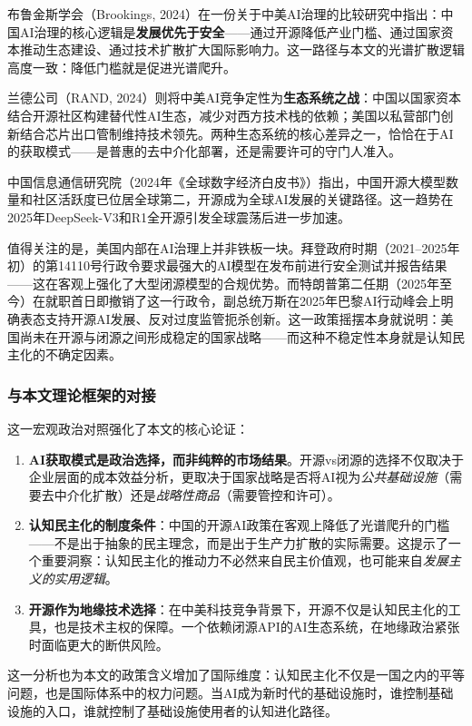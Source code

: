 \documentclass[12pt,a4paper]{ctexart}
\begin{document}
布鲁金斯学会（Brookings, 2024）在一份关于中美AI治理的比较研究中指出：中国AI治理的核心逻辑是\textbf{发展优先于安全}——通过开源降低产业门槛、通过国家资本推动生态建设、通过技术扩散扩大国际影响力。这一路径与本文的光谱扩散逻辑高度一致：降低门槛就是促进光谱爬升。

兰德公司（RAND, 2024）则将中美AI竞争定性为\textbf{生态系统之战}：中国以国家资本结合开源社区构建替代性AI生态，减少对西方技术栈的依赖；美国以私营部门创新结合芯片出口管制维持技术领先。两种生态系统的核心差异之一，恰恰在于AI的获取模式——是普惠的去中介化部署，还是需要许可的守门人准入。

中国信息通信研究院（2024年《全球数字经济白皮书》）指出，中国开源大模型数量和社区活跃度已位居全球第二，开源成为全球AI发展的关键路径。这一趋势在2025年DeepSeek-V3和R1全开源引发全球震荡后进一步加速。

值得关注的是，美国内部在AI治理上并非铁板一块。拜登政府时期（2021--2025年初）的第14110号行政令要求最强大的AI模型在发布前进行安全测试并报告结果——这在客观上强化了大型闭源模型的合规优势。而特朗普第二任期（2025年至今）在就职首日即撤销了这一行政令，副总统万斯在2025年巴黎AI行动峰会上明确表态支持开源AI发展、反对过度监管扼杀创新。这一政策摇摆本身就说明：美国尚未在开源与闭源之间形成稳定的国家战略——而这种不稳定性本身就是认知民主化的不确定因素。

\subsubsection{与本文理论框架的对接}

这一宏观政治对照强化了本文的核心论证：

\begin{enumerate}
\item \textbf{AI获取模式是政治选择，而非纯粹的市场结果}。开源vs闭源的选择不仅取决于企业层面的成本效益分析，更取决于国家战略是否将AI视为\textit{公共基础设施}（需要去中介化扩散）还是\textit{战略性商品}（需要管控和许可）。
\item \textbf{认知民主化的制度条件}：中国的开源AI政策在客观上降低了光谱爬升的门槛——不是出于抽象的民主理念，而是出于生产力扩散的实际需要。这提示了一个重要洞察：认知民主化的推动力不必然来自民主价值观，也可能来自\textit{发展主义的实用逻辑}。
\item \textbf{开源作为地缘技术选择}：在中美科技竞争背景下，开源不仅是认知民主化的工具，也是技术主权的保障。一个依赖闭源API的AI生态系统，在地缘政治紧张时面临更大的断供风险。
\end{enumerate}

这一分析也为本文的政策含义增加了国际维度：认知民主化不仅是一国之内的平等问题，也是国际体系中的权力问题。当AI成为新时代的基础设施时，谁控制基础设施的入口，谁就控制了基础设施使用者的认知进化路径。
\end{document}
